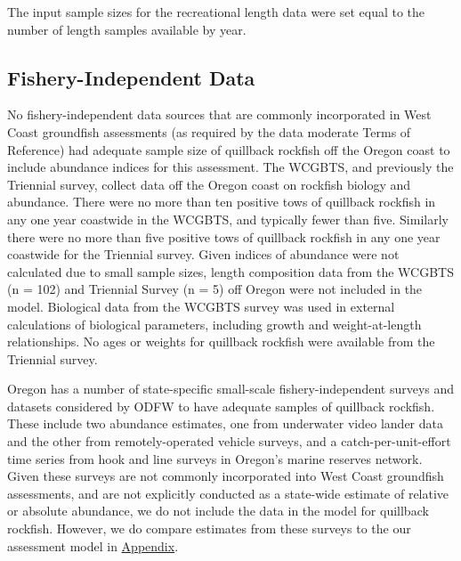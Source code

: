\documentclass[11pt,
  english,
  a4paper,
]{article}
\begin{document}
\leavevmode\tagmcend\tagstructend\par


The input sample sizes for the recreational length data were set equal to the number of length samples available by year.

\leavevmode\tagmcend\tagstructend\par


\hypertarget{fishery-independent-data}{%
\subsection{Fishery-Independent Data}\label{fishery-independent-data}}

\leavevmode\tagmcend\tagstructend


No fishery-independent data sources that are commonly incorporated in West Coast groundfish assessments (as required by the data moderate Terms of Reference) had adequate sample size of quillback rockfish off the Oregon coast to include abundance indices for this assessment. The WCGBTS, and previously the Triennial survey, collect data off the Oregon coast on rockfish biology and abundance. There were no more than ten positive tows of quillback rockfish in any one year coastwide in the WCGBTS, and typically fewer than five. Similarly there were no more than five positive tows of quillback rockfish in any one year coastwide for the Triennial survey. Given indices of abundance were not calculated due to small sample sizes, length composition data from the WCGBTS (n = 102) and Triennial Survey (n = 5) off Oregon were not included in the model. Biological data from the WCGBTS survey was used in external calculations of biological parameters, including growth and weight-at-length relationships. No ages or weights for quillback rockfish were available from the Triennial survey.

\leavevmode\tagmcend\tagstructend\par


Oregon has a number of state-specific small-scale fishery-independent surveys and datasets considered by ODFW to have adequate samples of quillback rockfish. These include two abundance estimates, one from underwater video lander data and the other from remotely-operated vehicle surveys, and a catch-per-unit-effort time series from hook and line surveys in Oregon's marine reserves network. Given these surveys are not commonly incorporated into West Coast groundfish assessments, and are not explicitly conducted as a state-wide estimate of relative or absolute abundance, we do not include the data in the model for quillback rockfish. However, we do compare estimates from these surveys to the our assessment model in {\protect\hyperlink{append_b}{Appendix}\leavevmode\tagmcend\tagstructend}.
\end{document}
